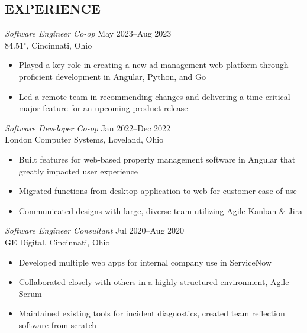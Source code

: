 \documentclass[margin]{res} %
\begin{document}
\begin{resume}
\vspace*{-7.5mm}
 
 
\section{EXPERIENCE}

{\sl Software Engineer Co-op} \hfill {\color{black} May 2023–Aug 2023}  \\
84.51$^{\circ}$, Cincinnati, Ohio 
\begin{itemize} \itemsep -2pt %
\item Played a key role in creating a new ad management web platform through proficient development in Angular, Python, and Go
\item  Led a remote team in recommending changes and delivering a time-critical major feature for an upcoming product release
\end{itemize}

{\sl Software Developer Co-op} \hfill {\color{black} Jan 2022–Dec 2022}  \\
London Computer Systems, Loveland, Ohio 
\begin{itemize} \itemsep -2pt %
\item Built features for web-based property management software in Angular that greatly impacted user experience
\item Migrated functions from desktop application to web for customer ease-of-use
\item Communicated designs with large, diverse team utilizing Agile Kanban \& Jira
\end{itemize}
 
{\sl Software Engineer Consultant} \hfill {\color{black} Jul 2020–Aug 2020} \\
GE Digital, Cincinnati, Ohio
\begin{itemize} \itemsep -2pt %
\item Developed multiple web apps for internal company use in ServiceNow
\item Collaborated closely with others in a highly-structured environment, Agile Scrum
\item Maintained existing tools for incident diagnostics, created team reflection software from scratch
\end{itemize} 


\end{resume}
\end{document}

